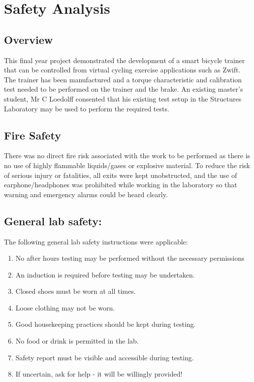 \newpage

\chapter{Safety Analysis}

\section*{Overview}

This final year project demonstrated the development of a smart bicycle trainer that can be controlled from virtual cycling exercise applications such as Zwift. The trainer has been manufactured and a torque characteristic and calibration test needed to be performed on the trainer and the brake. An existing master's student, Mr C Loedolff consented that his existing test setup in the Structures Laboratory may be used to perform the required tests.

\section*{Fire Safety}

There was no direct fire risk associated with the work to be performed as there is no use of highly flammable liquids/gases or explosive material. To reduce the risk of serious injury or fatalities, all exits were kept unobstructed, and the use of earphone/headphones was prohibited while working in the laboratory so that warning and emergency alarms could be heard clearly.

\newpage

\section*{General lab safety:}
The following general lab safety instructions were applicable:
\begin{enumerate}
	\item No after hours testing may be performed without the necessary permissions
	\item An induction is required before testing may be undertaken.
	\item Closed shoes must be worn at all times.
	\item Loose clothing may not be worn.
	\item Good housekeeping practices should be kept during testing.
	\item No food or drink is permitted in the lab.
	\item Safety report must be visible and accessible during testing.
	\item If uncertain, ask for help - it will be willingly provided!
\end{enumerate}

